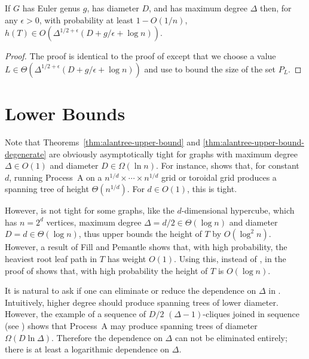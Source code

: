 \documentclass[lotsofwhite]{patmorin}
\begin{document}
\begin{thm}
  If $G$ has Euler genus $g$, has diameter $D$, and has maximum degree
  $\Delta$ then, for any $\epsilon>0$, with probability at least $1-O(1/n)$, $h(T)\in
  O(\Delta^{1/2+\epsilon}(D+g/\epsilon+\log n))$.
\end{thm}

\begin{proof}
  The proof is identical to the proof of
   except that we choose a value $L
  \in \Theta(\Delta^{1/2+\epsilon}(D+g/\epsilon+\log n))$ and use
   to bound the size of the set $P_L$.
\end{proof}


\section{Lower Bounds}

Note that Theorems~\ref{thm:alantree-upper-bound} and
\ref{thm:alantree-upper-bound-degenerate} are obviously asymptotically
tight for graphs with maximum degree $\Delta\in O(1)$ and diameter
$D\in\Omega(\ln n)$.  For instance, 
shows that, for constant $d$, running Process~A on a $n^{1/d}\times
\cdots\times n^{1/d}$ grid or toroidal grid produces a spanning tree of
height $\Theta(n^{1/d})$.  For $d\in O(1)$, this is tight.

However,  is not tight for some graphs,
like the $d$-dimensional hypercube, which has $n=2^d$ vertices, maximum
degree $\Delta = d/2 \in \Theta(\log n)$ and diameter $D=d\in\Theta(\log
n)$, thus  upper bounds the height
of $T$ by $O(\log^2 n)$.  However, a result of Fill and Pemantle
\cite{fill.pemantle:first} shows that, with high probability, the
heaviest root leaf path in $T$ has weight $O(1)$.  Using this, instead
of , in the proof of 
shows that, with high probability the height of $T$ is $O(\log n)$.

It is natural to ask if one can eliminate or reduce the dependence on
$\Delta$ in .  Intuitively, higher degree
should produce spanning trees of lower diameter.  However, the example
of a sequence of $D/2$ $(\Delta-1)$-cliques joined in sequence (see
) shows that Process~A may produce spanning trees
of diameter $\Omega(D\ln\Delta)$.  Therefore the dependence on $\Delta$
can not be eliminated entirely; there is at least a logarithmic dependence
on $\Delta$.
\end{document}
